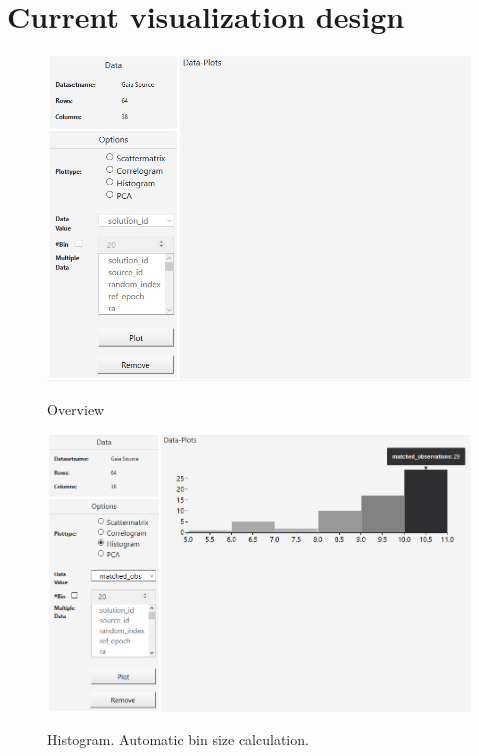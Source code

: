 \documentclass{article}
\begin{document}
\section{Current visualization design}
\newpage
\begin{figure}[!h]
\centering
\includegraphics[width=1\textwidth]{images/m3/uebersicht.PNG}
\label{fig1}
\caption{Overview}
\end{figure} 
\newpage
\begin{figure}[!h]
\centering
\includegraphics[width=1\textwidth]{images/m3/histogram1.PNG}
\label{fig2}
\caption{Histogram. Automatic bin size calculation.}
\end{figure}
\newpage
\end{document}
